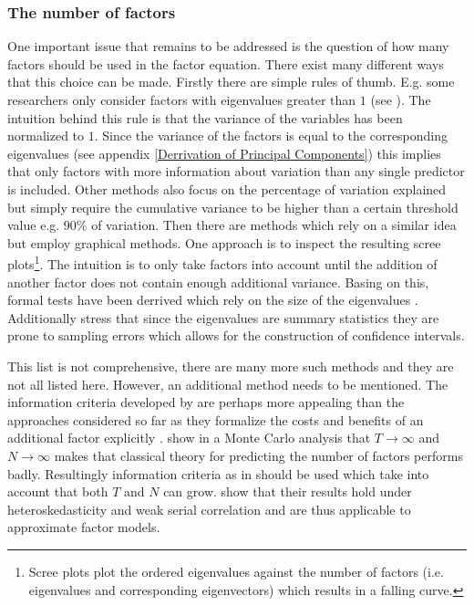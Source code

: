 \documentclass[12pt]{article}
\begin{document}
\subsubsection{The number of factors}
One important issue that remains to be addressed is the question of how many factors should be used in the factor equation. There exist many different ways that this choice can be made. Firstly there are simple rules of thumb. E.g. some researchers only consider factors with eigenvalues greater than $1$ (see \citet{larsen2010estimating}). The intuition behind this rule is that the variance of the variables has been normalized to $1$. Since the variance of the factors is equal to the corresponding eigenvalues (see appendix \ref{Derrivation of Principal Components}) this implies that only factors with more information about variation than any single predictor is included. Other methods also focus on the percentage of variation explained but simply require the cumulative variance to be higher than a certain threshold value e.g. 90\% of variation. Then there are methods which rely on a similar idea but employ graphical methods. One approach is to inspect the resulting scree plots\footnote{Scree plots plot the ordered eigenvalues against the number of factors (i.e. eigenvalues and corresponding eigenvectors) which results in a falling curve.}. The intuition is to only take factors into account until the addition of another factor does not contain enough additional variance. Basing on this, formal tests have been derrived which rely on the size of the eigenvalues \citep{stock2011dynamic}. Additionally \citet{larsen2010estimating} stress that since the eigenvalues are summary statistics they are prone to sampling errors which allows for the construction of confidence intervals.

This list is not comprehensive, there are many more such methods and they are not all listed here. However, an additional method needs to be mentioned. The information criteria developed by \citet{bai2002determining} are perhaps more appealing than the approaches considered so far as they formalize the costs and benefits of an additional factor explicitly \citep{stock2011dynamic}. \citet{cragg1997inferring} show in a Monte Carlo analysis that $T\rightarrow\infty$ and $N\rightarrow\infty$ makes that classical theory for predicting the number of factors performs badly. Resultingly information criteria as in \citet{bai2002determining} should be used which take into account that both $T$ and $N$ can grow. \citet{bai2002determining} show that their results hold under heteroskedasticity and weak serial correlation and are thus applicable to approximate factor models.
\end{document}

